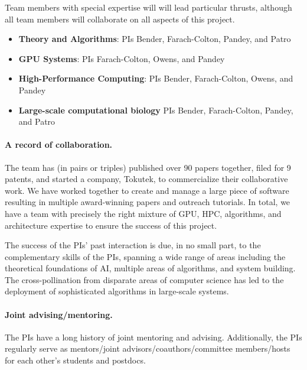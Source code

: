 Team members with special expertise will will lead particular thrusts, although all team members will collaborate on all aspects of this project.
\begin{itemize}%
    \item \textbf{Theory and Algorithms}: PIs Bender, Farach-Colton, Pandey, and Patro
    

    \item \textbf{GPU Systems}: PIs Farach-Colton, Owens, and Pandey

    \item \textbf{High-Performance Computing}: PIs Bender, Farach-Colton, Owens, and Pandey

    \item \textbf{Large-scale computational biology} PIs Bender, Farach-Colton, Pandey, and Patro

\end{itemize}



\paragraph{A record of collaboration.} The team has (in pairs or triples) published over 90 papers together, filed for
9 patents, and started a company, Tokutek, to commercialize their collaborative work. We have worked
together to create and manage a large piece of software resulting in multiple award-winning papers and
outreach tutorials. In total, we have a team with precisely the right mixture of GPU, HPC, algorithms, and architecture expertise to ensure the success of this project.

The success of the PIs’ past interaction is due, in no small part, to the complementary skills of the PIs,
spanning a wide range of areas including the theoretical foundations of AI, multiple areas of algorithms, and
system building. The cross-pollination from disparate areas of
computer science has led to the deployment of sophisticated algorithms in large-scale systems.

\paragraph{Joint advising/mentoring.} The PIs have a long history of joint mentoring and advising.  Additionally, the PIs regularly serve as mentors/joint advisors/coauthors/committee members/hosts for each other’s students and postdocs.
